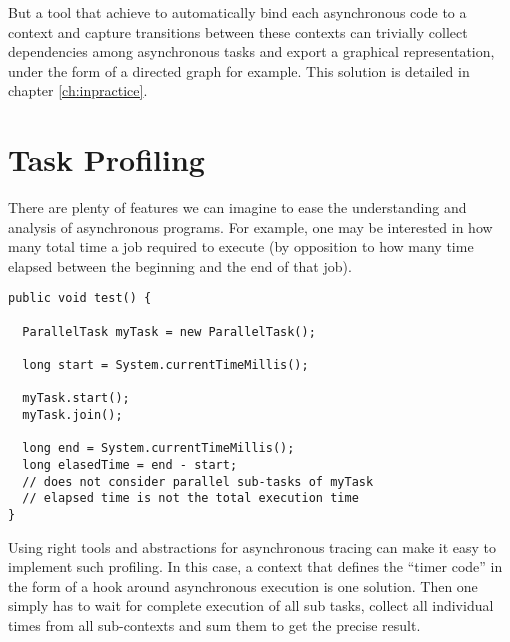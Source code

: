 But a tool that achieve to automatically bind each asynchronous code to a context and capture transitions between these contexts can trivially collect dependencies among asynchronous tasks and export a graphical representation, under the form of a directed graph for example. This solution is detailed in chapter \ref{ch:inpractice}.

\section{Task Profiling}

There are plenty of features we can imagine to ease the understanding and analysis of asynchronous programs. For example, one may be interested in how many total time a job required to execute (by opposition to how many time elapsed between the beginning and the end of that job).

\begin{lstlisting}
public void test() {
  
  ParallelTask myTask = new ParallelTask();

  long start = System.currentTimeMillis();

  myTask.start();
  myTask.join();

  long end = System.currentTimeMillis();
  long elasedTime = end - start;
  // does not consider parallel sub-tasks of myTask
  // elapsed time is not the total execution time
}
\end{lstlisting}

Using right tools and abstractions for asynchronous tracing can make it easy to implement such profiling. In this case, a context that defines the ``timer code'' in the form of a hook around asynchronous execution is one solution. Then one simply has to wait for complete execution of all sub tasks, collect all individual times from all sub-contexts and sum them to get the precise result.


